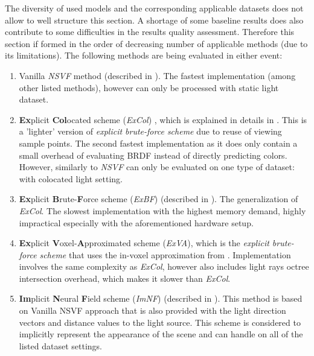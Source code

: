 The diversity of used models and the corresponding applicable datasets
does not allow to well structure this section.
A shortage of some baseline results does also contribute to some difficulties in the results quality assessment.
Therefore this section if formed in the order of decreasing number of applicable methods (due to its limitations).
The following methods are being evaluated in either event:
\begin{enumerate}
    \item Vanilla \textit{NSVF} method \cite{liu2021neural} (described in ).
    The fastest implementation (among other listed methods),
    however can only be processed with static light dataset.
    \item \textbf{Ex}plicit \textbf{Col}ocated scheme (\textit{ExCol}) \cite{bi2020neural, liu2021neural}, which is explained in details in .
    This is a 'lighter' version of \textit{explicit brute-force scheme}
    due to reuse of viewing sample points.
    The second fastest implementation as it does only contain
    a small overhead of evaluating BRDF instead of directly predicting colors.
    However, similarly to \textit{NSVF} can only be evaluated on one type of dataset: with colocated light setting.
    \item \textbf{Ex}plicit \textbf{B}rute-\textbf{F}orce scheme (\textit{ExBF}) (described in ).
    The generalization of \textit{ExCol}.
    The slowest implementation with the highest memory demand,
    highly impractical especially with the aforementioned hardware setup.
    \item \textbf{Ex}plicit \textbf{V}oxel-\textbf{A}pproximated scheme (\textit{ExVA}), which is the \textit{explicit brute-force scheme}
    that uses the in-voxel approximation from .
    Implementation involves the same complexity as \textit{ExCol},
    however also includes light rays octree intersection overhead,
    which makes it slower than \textit{ExCol}.
    \item \textbf{Im}plicit \textbf{N}eural \textbf{F}ield scheme (\textit{ImNF}) (described in ).
    This method is based on Vanilla NSVF approach
    that is also provided with the light direction vectors and distance values to the light source.
    This scheme is considered to implicitly represent the appearance of the scene
    and can handle on all of the listed dataset settings.
\end{enumerate}


